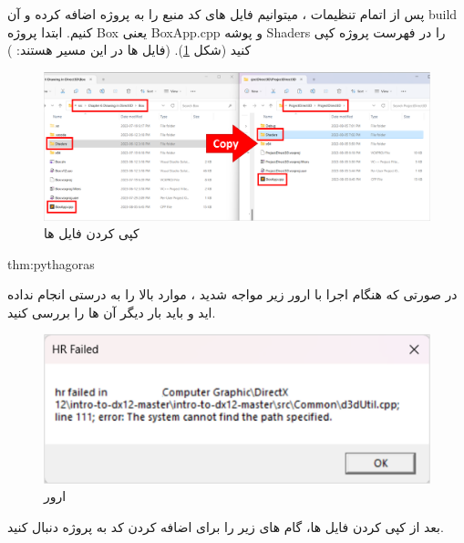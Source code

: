 \textbf{\vspace{-30pt}}
\title{
    \LARGE
}
\textbf{\vspace{-15pt}}

{
    \Large
    \begin{spacing}{1.3}
        پس از اتمام تنظیمات ، میتوانیم فایل های کد منبع را به پروژه اضافه کرده و آن build کنیم.
        ابتدا پروژه Box یعنی BoxApp.cpp و پوشه Shaders را در فهرست پروژه کپی کنید (شکل \ref{fig:3.Intro.5.8.1}).
        (فایل ها در این مسیر هستند: )

        \begin{figure}[H]
            \centering
            \setlength{\belowcaptionskip}{-10pt}
            \includegraphics[width=\textwidth]{Images/3/3.Intro.5.8.1}
            \caption{کپی کردن فایل ها}
            \label{fig:3.Intro.5.8.1}
        \end{figure}

        \begin{theo}{thm:pythagoras}
        {
            \Large
            در صورتی که هنگام اجرا با ارور زیر مواجه شدید ، موارد بالا را به درستی انجام نداده اید و باید بار دیگر آن ها را بررسی کنید.

            \begin{figure}[H]
                \centering
                \setlength{\belowcaptionskip}{-10pt}
                \includegraphics[scale=0.8]{Images/3/3.Intro.5.8.2}
                \caption{ارور  \textbf{\vspace{12pt}}}
                \label{fig:3.Intro.5.8.2}
            \end{figure}
        }
        \end{theo}
        \textbf{\vspace{6pt}}
        بعد از کپی کردن فایل ها، گام های زیر را برای اضافه کردن کد به پروژه دنبال کنید.


\end{spacing}}
